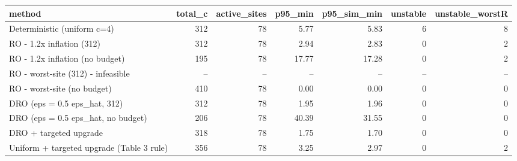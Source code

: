 \begin{tabular}{lrrrrrr}
\toprule
method & total\_c & active\_sites & p95\_min & p95\_sim\_min & unstable & unstable\_worstR \\
\midrule
Deterministic (uniform c=4) & 312 & 78 & 5.77 & 5.83 & 6 & 8 \\
RO - 1.2x inflation (312) & 312 & 78 & 2.94 & 2.83 & 0 & 2 \\
RO - 1.2x inflation (no budget) & 195 & 78 & 17.77 & 17.28 & 0 & 2 \\
RO - worst-site (312) - infeasible & -- & -- & -- & -- & -- & -- \\
RO - worst-site (no budget) & 410 & 78 & 0.00 & 0.00 & 0 & 0 \\
DRO (eps = 0.5 eps\_hat, 312) & 312 & 78 & 1.95 & 1.96 & 0 & 0 \\
DRO (eps = 0.5 eps\_hat, no budget) & 206 & 78 & 40.39 & 31.55 & 0 & 0 \\
DRO + targeted upgrade & 318 & 78 & 1.75 & 1.70 & 0 & 0 \\
Uniform + targeted upgrade (Table 3 rule) & 356 & 78 & 3.25 & 2.97 & 0 & 2 \\
\bottomrule
\end{tabular}
